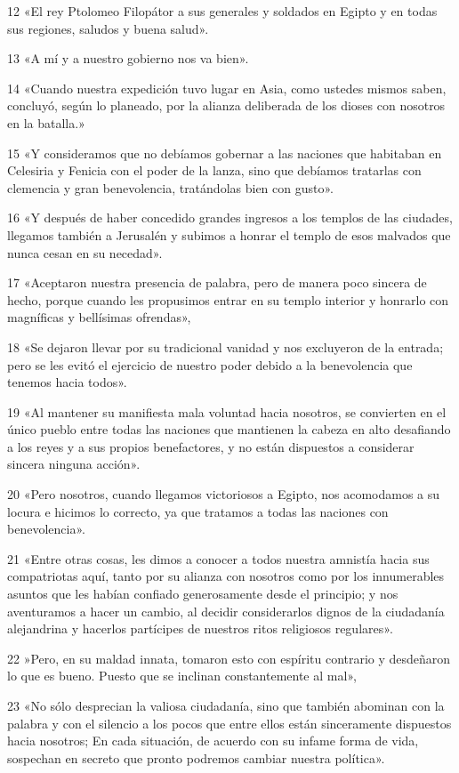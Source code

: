 \par 12 «El rey Ptolomeo Filopátor a sus generales y soldados en Egipto y en todas sus regiones, saludos y buena salud».
\par 13 «A mí y a nuestro gobierno nos va bien».
\par 14 «Cuando nuestra expedición tuvo lugar en Asia, como ustedes mismos saben, concluyó, según lo planeado, por la alianza deliberada de los dioses con nosotros en la batalla.»
\par 15 «Y consideramos que no debíamos gobernar a las naciones que habitaban en Celesiria y Fenicia con el poder de la lanza, sino que debíamos tratarlas con clemencia y gran benevolencia, tratándolas bien con gusto».
\par 16 «Y después de haber concedido grandes ingresos a los templos de las ciudades, llegamos también a Jerusalén y subimos a honrar el templo de esos malvados que nunca cesan en su necedad».
\par 17 «Aceptaron nuestra presencia de palabra, pero de manera poco sincera de hecho, porque cuando les propusimos entrar en su templo interior y honrarlo con magníficas y bellísimas ofrendas»,
\par 18 «Se dejaron llevar por su tradicional vanidad y nos excluyeron de la entrada; pero se les evitó el ejercicio de nuestro poder debido a la benevolencia que tenemos hacia todos».
\par 19 «Al mantener su manifiesta mala voluntad hacia nosotros, se convierten en el único pueblo entre todas las naciones que mantienen la cabeza en alto desafiando a los reyes y a sus propios benefactores, y no están dispuestos a considerar sincera ninguna acción».
\par 20 «Pero nosotros, cuando llegamos victoriosos a Egipto, nos acomodamos a su locura e hicimos lo correcto, ya que tratamos a todas las naciones con benevolencia».
\par 21 «Entre otras cosas, les dimos a conocer a todos nuestra amnistía hacia sus compatriotas aquí, tanto por su alianza con nosotros como por los innumerables asuntos que les habían confiado generosamente desde el principio; y nos aventuramos a hacer un cambio, al decidir considerarlos dignos de la ciudadanía alejandrina y hacerlos partícipes de nuestros ritos religiosos regulares».
\par 22 »Pero, en su maldad innata, tomaron esto con espíritu contrario y desdeñaron lo que es bueno. Puesto que se inclinan constantemente al mal»,
\par 23 «No sólo desprecian la valiosa ciudadanía, sino que también abominan con la palabra y con el silencio a los pocos que entre ellos están sinceramente dispuestos hacia nosotros; En cada situación, de acuerdo con su infame forma de vida, sospechan en secreto que pronto podremos cambiar nuestra política».
